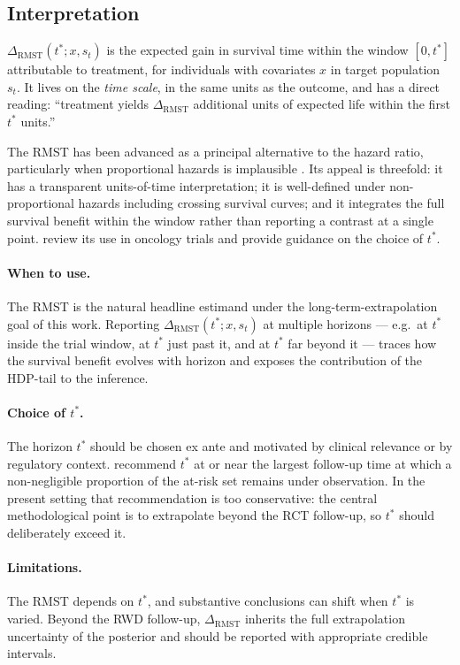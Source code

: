 \documentclass[11pt]{article}
\newcommand{\RMST}{\mathrm{RMST}}
\begin{document}
\subsection{Interpretation}

$\Delta_{\RMST}(t^{*}; x, s_{t})$ is the expected gain in survival time
within the window $[0, t^{*}]$ attributable to treatment, for individuals
with covariates $x$ in target population $s_{t}$. It lives on the
\emph{time scale}, in the same units as the outcome, and has a direct
reading: ``treatment yields $\Delta_{\RMST}$ additional units of expected
life within the first $t^{*}$ units.''

The RMST has been advanced as a principal alternative to the hazard ratio,
particularly when proportional hazards is implausible
\citep{Royston2011, Royston2013, Uno2014}. Its appeal is threefold: it has
a transparent units-of-time interpretation; it is well-defined under
non-proportional hazards including crossing survival curves; and it
integrates the full survival benefit within the window rather than
reporting a contrast at a single point. \citet{Uno2014} review its use in
oncology trials and provide guidance on the choice of $t^{*}$.

\paragraph{When to use.} The RMST is the natural headline estimand under
the long-term-extrapolation goal of this work. Reporting
$\Delta_{\RMST}(t^{*}; x, s_{t})$ at multiple horizons --- e.g.\ at
$t^{*}$ inside the trial window, at $t^{*}$ just past it, and at
$t^{*}$ far beyond it --- traces how the survival benefit evolves with
horizon and exposes the contribution of the HDP-tail to the inference.

\paragraph{Choice of $t^{*}$.} The horizon $t^{*}$ should be chosen
ex ante and motivated by clinical relevance or by regulatory context.
\citet{Royston2013} recommend $t^{*}$ at or near the largest follow-up
time at which a non-negligible proportion of the at-risk set remains
under observation. In the present setting that recommendation is too
conservative: the central methodological point is to extrapolate beyond
the RCT follow-up, so $t^{*}$ should deliberately exceed it.

\paragraph{Limitations.} The RMST depends on $t^{*}$, and substantive
conclusions can shift when $t^{*}$ is varied. Beyond the RWD follow-up,
$\Delta_{\RMST}$ inherits the full extrapolation uncertainty of the
posterior and should be reported with appropriate credible intervals.
\end{document}
